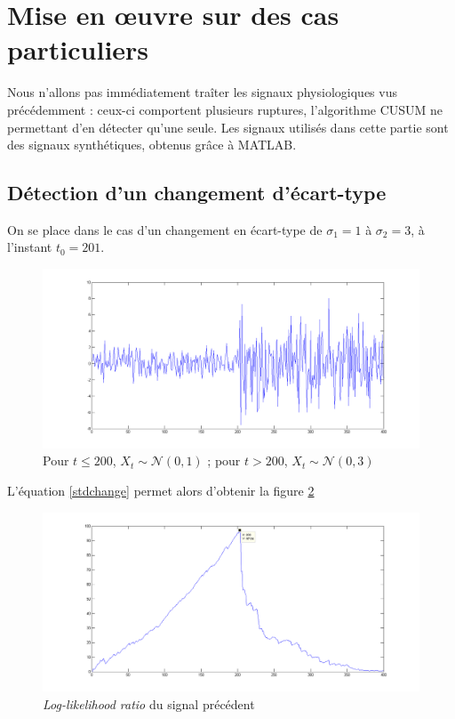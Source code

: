 \documentclass[french,12pt,notitlepage]{report}
\begin{document}
	\section{Mise en œuvre sur des cas particuliers}
	Nous n'allons pas immédiatement traîter les signaux physiologiques vus précédemment : ceux-ci comportent plusieurs ruptures, l'algorithme CUSUM ne permettant d'en détecter qu'une seule. Les signaux utilisés dans cette partie sont des signaux synthétiques, obtenus grâce à MATLAB.

	\subsection{Détection d'un changement d'écart-type}
	
	On se place dans le cas d'un changement en écart-type de $\sigma_1 = 1$ à $\sigma_2 = 3$, à l'instant $t_0 = 201$.
	
	\begin{figure}[h]
		\includegraphics[scale=0.4]{test_signal_std.png}
		\caption{Pour $t \leq 200$, $X_t \sim \mathcal{N}(0, 1)$ ; pour $t > 200$, $X_t \sim \mathcal{N}(0, 3)$}
		\label{test_signal_std}
	\end{figure}
	
	L'équation \ref{stdchange} permet alors d'obtenir la figure \ref{llr_test_std}
	
	\begin{figure}[h]
		\includegraphics[scale=0.4]{llr_test_std.png}
		\caption{\textit{Log-likelihood ratio} du signal précédent}
		\label{llr_test_std}
	\end{figure}
	
\end{document}
